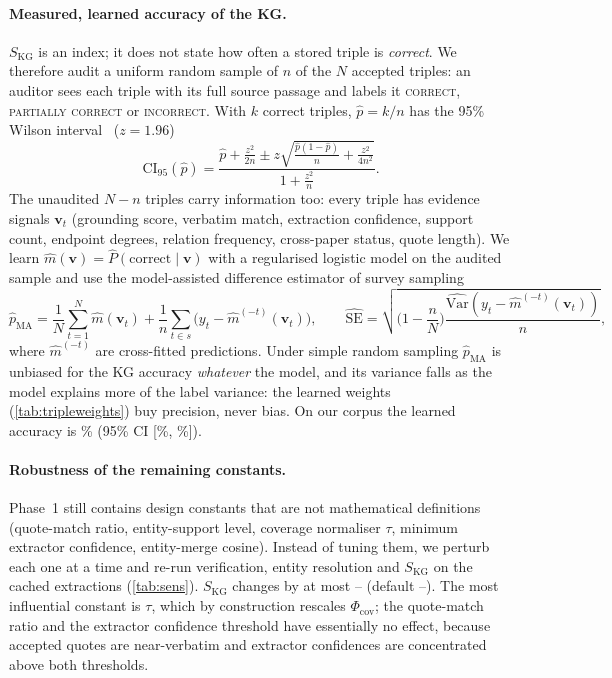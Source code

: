 \documentclass[10pt,twocolumn]{article}
\theoremstyle{remark}
\newcommand{\SensDefault}{--}\newcommand{\SensMaxDev}{--}\newcommand{\SensRange}{--}
\begin{document}
\paragraph{Measured, learned accuracy of the KG.}
$S_{\mathrm{KG}}$ is an index; it does not state how often a stored triple is \emph{correct}. We therefore audit a
uniform random sample of $n$ of the $N$ accepted triples: an auditor sees each triple with its full source passage
and labels it \textsc{correct}, \textsc{partially correct} or \textsc{incorrect}. With $k$ correct triples,
$\hat p=k/n$ has the 95\% Wilson interval~\cite{wilson1927probable} ($z=1.96$)
\begin{equation}
\mathrm{CI}_{95}(\hat p)=\frac{\hat p+\frac{z^2}{2n}\pm z\sqrt{\frac{\hat p(1-\hat p)}{n}+\frac{z^2}{4n^2}}}{1+\frac{z^2}{n}}.
\label{eq:wilson}
\end{equation}
The unaudited $N-n$ triples carry information too: every triple has evidence signals $\bm v_t$ (grounding score,
verbatim match, extraction confidence, support count, endpoint degrees, relation frequency, cross-paper status,
quote length). We learn $\hat m(\bm v)=\hat P(\text{correct}\mid\bm v)$ with a regularised logistic model on the audited
sample and use the model-assisted difference estimator of survey sampling~\cite{sarndal1992model}
\begin{equation}
\hat p_{\mathrm{MA}}=\frac1N\sum_{t=1}^{N}\hat m(\bm v_t)+\frac1n\sum_{t\in s}\big(y_t-\hat m^{(-t)}(\bm v_t)\big),
\qquad
\widehat{\mathrm{SE}}=\sqrt{\Big(1-\frac nN\Big)\frac{\widehat{\mathrm{Var}}(y_t-\hat m^{(-t)}(\bm v_t))}{n}},
\label{eq:ma}
\end{equation}
where $\hat m^{(-t)}$ are cross-fitted predictions. Under simple random sampling $\hat p_{\mathrm{MA}}$ is unbiased for
the KG accuracy \emph{whatever} the model, and its variance falls as the model explains more of the label variance:
the learned weights (\cref{tab:tripleweights}) buy precision, never bias. On our corpus the learned accuracy is
\KGAccLearned\% (95\% CI [\KGAccLo\%, \KGAccHi\%]).

\paragraph{Robustness of the remaining constants.}
Phase~1 still contains design constants that are not mathematical definitions (quote-match ratio, entity-support
level, coverage normaliser $\tau$, minimum extractor confidence, entity-merge cosine). Instead of tuning them, we
perturb each one at a time and re-run verification, entity resolution and $S_{\mathrm{KG}}$ on the cached extractions
(\cref{tab:sens}). $S_{\mathrm{KG}}$ changes by at most \SensMaxDev{} (default \SensDefault). The most influential
constant is $\tau$, which by construction rescales $\Phi_{\mathrm{cov}}$; the quote-match ratio and the extractor
confidence threshold have essentially no effect, because accepted quotes are near-verbatim and extractor confidences
are concentrated above both thresholds.
\end{document}
